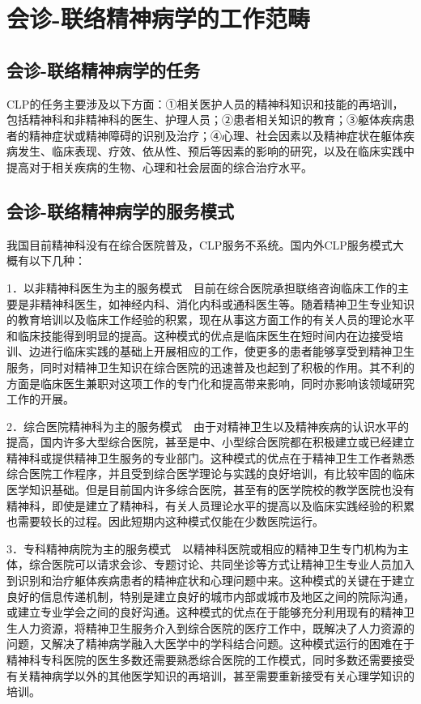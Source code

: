 \section{会诊-联络精神病学的工作范畴}

\subsection{会诊-联络精神病学的任务}

CLP的任务主要涉及以下方面：①相关医护人员的精神科知识和技能的再培训，包括精神科和非精神科的医生、护理人员；②患者相关知识的教育；③躯体疾病患者的精神症状或精神障碍的识别及治疗；④心理、社会因素以及精神症状在躯体疾病发生、临床表现、疗效、依从性、预后等因素的影响的研究，以及在临床实践中提高对于相关疾病的生物、心理和社会层面的综合治疗水平。

\subsection{会诊-联络精神病学的服务模式}

我国目前精神科没有在综合医院普及，CLP服务不系统。国内外CLP服务模式大概有以下几种：

1．以非精神科医生为主的服务模式　目前在综合医院承担联络咨询临床工作的主要是非精神科医生，如神经内科、消化内科或通科医生等。随着精神卫生专业知识的教育培训以及临床工作经验的积累，现在从事这方面工作的有关人员的理论水平和临床技能得到明显的提高。这种模式的优点是临床医生在短时间内在边接受培训、边进行临床实践的基础上开展相应的工作，使更多的患者能够享受到精神卫生服务，同时对精神卫生知识在综合医院的迅速普及也起到了积极的作用。其不利的方面是临床医生兼职对这项工作的专门化和提高带来影响，同时亦影响该领域研究工作的开展。

2．综合医院精神科为主的服务模式　由于对精神卫生以及精神疾病的认识水平的提高，国内许多大型综合医院，甚至是中、小型综合医院都在积极建立或已经建立精神科或提供精神卫生服务的专业部门。这种模式的优点在于精神卫生工作者熟悉综合医院工作程序，并且受到综合医学理论与实践的良好培训，有比较牢固的临床医学知识基础。但是目前国内许多综合医院，甚至有的医学院校的教学医院也没有精神科，即使是建立了精神科，有关人员理论水平的提高以及临床实践经验的积累也需要较长的过程。因此短期内这种模式仅能在少数医院运行。

3．专科精神病院为主的服务模式　以精神科医院或相应的精神卫生专门机构为主体，综合医院可以请求会诊、专题讨论、共同坐诊等方式让精神卫生专业人员加入到识别和治疗躯体疾病患者的精神症状和心理问题中来。这种模式的关键在于建立良好的信息传递机制，特别是建立良好的城市内部或城市及地区之间的院际沟通，或建立专业学会之间的良好沟通。这种模式的优点在于能够充分利用现有的精神卫生人力资源，将精神卫生服务介入到综合医院的医疗工作中，既解决了人力资源的问题，又解决了精神病学融入大医学中的学科结合问题。这种模式运行的困难在于精神科专科医院的医生多数还需要熟悉综合医院的工作模式，同时多数还需要接受有关精神病学以外的其他医学知识的再培训，甚至需要重新接受有关心理学知识的培训。

